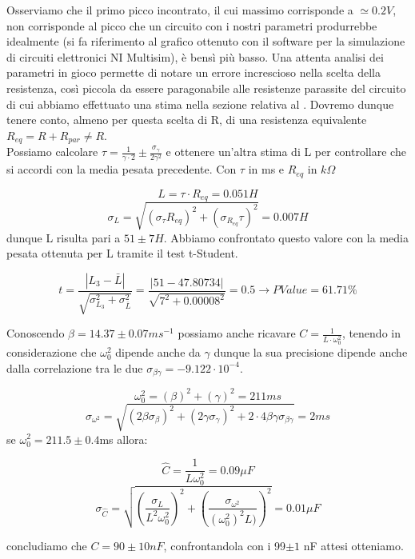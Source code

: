 \documentclass[a4paper]{article}
\theoremstyle{definition}
\begin{document}
\noindent Osserviamo che il primo picco incontrato, il cui massimo corrisponde a \(\simeq 0.2V\), non corrisponde al picco che un circuito con i nostri parametri produrrebbe idealmente (si fa riferimento al grafico ottenuto con il software per la simulazione di circuiti elettronici NI Multisim), è bensì più basso. Una attenta analisi dei parametri in gioco permette di notare un errore increscioso nella scelta della resistenza, così piccola da essere paragonabile alle resistenze parassite del circuito di cui abbiamo effettuato una stima nella sezione  relativa al . Dovremo dunque tenere conto, almeno per questa scelta di R, di una resistenza equivalente \(R_{eq}  = R + R_{par} \neq R\). \\
\noindent Possiamo calcolare \(\tau = \frac{1}{\gamma \cdot 2}\pm \frac{\sigma_{\gamma}}{2\gamma^{2}}\) e ottenere un'altra stima di L per controllare che si accordi con la media pesata precedente. Con \(\tau\) in ms e \(R_{eq}\) in \(k \Omega\)

\[L = \tau \cdot  R_{eq}=  0.051  H \]
\[\sigma_{L} = \sqrt{(\sigma_{\tau}  R_{eq})^{2} + ( \sigma_{R_{eq}} \tau  )^{2}} = 0.007  H\]
dunque L risulta pari a \( 51 \pm 7 H \). Abbiamo confrontato questo valore con la media pesata ottenuta per L tramite il test t-Student. 

\[t = \frac{\left|L_{3} - \bar{L} \right|}{\sqrt{\sigma^{2}_{L_{3}} + \sigma^{2}_{\bar{L}}}} = \frac{\left| 51 - 47.80734\right|}{\sqrt{7^{2} + 0.00008^{2}}} = 0.5 \rightarrow PValue = 61.71\%\]

\noindent Conoscendo \(\beta = 14.37 \pm 0.07 ms^{-1}\) possiamo anche ricavare \(C = \frac{1}{L \cdot \omega^{2}_{0}}\), tenendo in considerazione che \(\omega^{2}_{0}\) dipende anche da \(\gamma\) dunque la sua precisione dipende anche dalla correlazione tra le due \(\sigma_{\beta \gamma} = -9.122  \cdot 10^{-4}\). 

\[\omega^{2}_{0} =( \beta )^{2} + ( \gamma)^{2} = 211 ms\]
    \[ \sigma_{\omega^{2}} = \sqrt{  (2\beta\sigma_{\beta})^{2} + (2\gamma\sigma_{\gamma})^{2} + 2 \cdot 4 \beta \gamma \sigma_{\beta \gamma}  } = 2 ms\]
se \(\omega^{2}_{0}= 211.5 \pm 0.4\)ms allora:

\[\hat{C} = \frac{1}{L\omega^{2}_{0}} = 0.09 \mu F\]
    \[ \sigma_{\hat{C}} = \sqrt{ \left(\frac{\sigma_{L}}{L^{2}\omega^{2}_{0}}\right)^{2} +\left(\frac{\sigma_{\omega^{2}}}{(\omega^{2}_{0})^{2}L)}\right)^{2}  } =  0.01\mu F\]
    
    
\noindent concludiamo che \(C = 90 \pm 10 nF\), confrontandola con i 99\(\pm 1\) nF attesi otteniamo.
\end{document}

